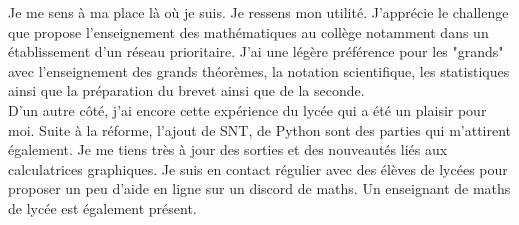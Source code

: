 \documentclass[11pt]{article}
\begin{document}
 Je me sens à ma place là où je suis. Je ressens mon utilité. J'apprécie le challenge que propose l'enseignement des mathématiques au collège notamment dans un établissement d'un réseau prioritaire. J'ai une légère préférence pour les "grands" avec l'enseignement des grands théorèmes, la notation scientifique, les statistiques ainsi que la préparation du brevet ainsi que de la seconde. \\

 D'un autre côté, j'ai encore cette expérience du lycée qui a été un plaisir pour moi. Suite à la réforme, l'ajout de SNT, de Python sont des parties qui m'attirent également. Je me tiens très à jour des sorties et des nouveautés liés aux calculatrices graphiques. Je suis en contact régulier avec des élèves de lycées pour proposer un peu d'aide en ligne sur un discord de maths. Un enseignant de maths de lycée est également présent. 
\end{document}
